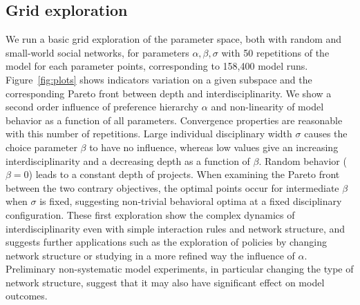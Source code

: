 \documentclass[utf8]{frontiersFPHY} %
\begin{document}
\subsection{Grid exploration}

We run a basic grid exploration of the parameter space, both with random and small-world social networks, for parameters $\alpha,\beta,\sigma$ with 50 repetitions of the model for each parameter points, corresponding to 158,400 model runs. Figure~\ref{fig:plots} shows indicators variation on a given subspace and the corresponding Pareto front between depth and interdisciplinarity. We show a second order influence of preference hierarchy $\alpha$ and non-linearity of model behavior as a function of all parameters. Convergence properties are reasonable with this number of repetitions. Large individual disciplinary width $\sigma$ causes the choice parameter $\beta$ to have no influence, whereas low values give an increasing interdisciplinarity and a decreasing depth as a function of $\beta$. Random behavior ($\beta = 0$) leads to a constant depth of projects. When examining the Pareto front between the two contrary objectives, the optimal points occur for intermediate $\beta$ when $\sigma$ is fixed, suggesting non-trivial behavioral optima at a fixed disciplinary configuration. These first exploration show the complex dynamics of interdisciplinarity even with simple interaction rules and network structure, and suggests further applications such as the exploration of policies by changing network structure or studying in a more refined way the influence of $\alpha$. Preliminary non-systematic model experiments, in particular changing the type of network structure, suggest that it may also have significant effect on model outcomes.
\end{document}
